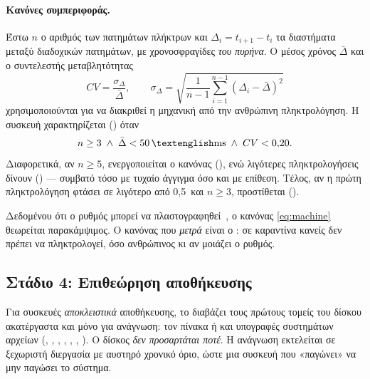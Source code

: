 \paragraph{Κανόνες συμπεριφοράς.}
Έστω $n$ ο αριθμός των πατημάτων πλήκτρων και $\Delta_i = t_{i+1}-t_i$ τα
διαστήματα μεταξύ διαδοχικών πατημάτων, με χρονοσφραγίδες \emph{του πυρήνα}. Ο
μέσος χρόνος $\bar\Delta$ και ο συντελεστής μεταβλητότητας
\begin{equation}
  CV = \frac{\sigma_\Delta}{\bar\Delta},\qquad
  \sigma_\Delta = \sqrt{\frac{1}{n-1}\sum_{i=1}^{n-1}\left(\Delta_i-\bar\Delta\right)^2}
  \label{eq:cv}
\end{equation}
χρησιμοποιούνται για να διακριθεί η μηχανική από την ανθρώπινη πληκτρολόγηση.
Η συσκευή χαρακτηρίζεται  (\sevC) όταν
\begin{equation}
  n \geq 3 \;\wedge\; \bar\Delta < 50\,\text{\en{ms}} \;\wedge\; CV < 0{,}20 .
  \label{eq:machine}
\end{equation}
Διαφορετικά, αν $n \ge 5$, ενεργοποιείται ο κανόνας 
(\sevC), ενώ λιγότερες πληκτρολογήσεις δίνουν 
(\sevW) — συμβατό τόσο με τυχαίο άγγιγμα όσο και με επίθεση. Τέλος, αν η πρώτη
πληκτρολόγηση φτάσει σε λιγότερο από 0{,}5\, και $n\ge3$, προστίθεται
 (\sevW).

\begin{remark}
Δεδομένου ότι ο ρυθμός μπορεί να πλαστογραφηθεί~\cite{farhi2019malboard}, ο
κανόνας \eqref{eq:machine} θεωρείται παρακάμψιμος. Ο κανόνας που \emph{μετρά}
είναι ο : σε καραντίνα κανείς δεν πρέπει να πληκτρολογεί,
όσο ανθρώπινος κι αν μοιάζει ο ρυθμός.
\end{remark}

\subsection{Στάδιο 4: Επιθεώρηση αποθήκευσης}
\label{sec:design-stage4}

Για συσκευές \emph{αποκλειστικά} αποθήκευσης, το \Probolos{} διαβάζει τους
πρώτους τομείς του δίσκου ακατέργαστα και μόνο για ανάγνωση: τον πίνακα
 ή  και υπογραφές συστημάτων αρχείων (, ,
, , , , ). Ο δίσκος
\emph{δεν προσαρτάται ποτέ}. Η ανάγνωση εκτελείται σε ξεχωριστή διεργασία με
αυστηρό χρονικό όριο, ώστε μια συσκευή που «παγώνει» να μην παγώσει το
σύστημα.

